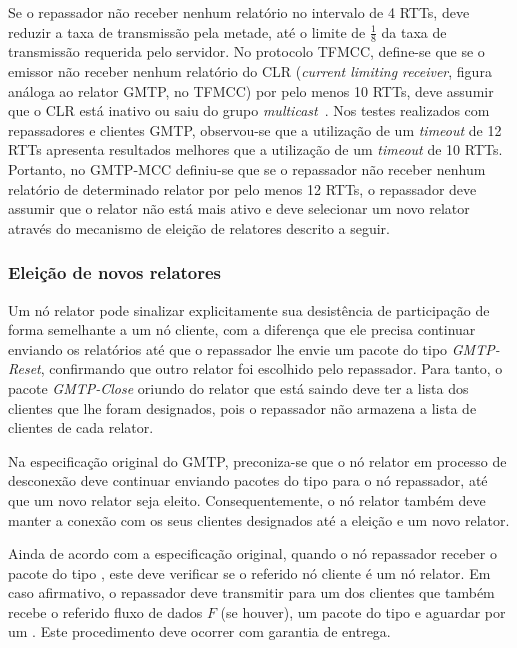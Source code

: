 Se o repassador não receber nenhum relatório no intervalo de 4 RTTs, deve reduzir a taxa de transmissão pela metade, até o limite de $\frac{1}{8}$ da taxa de transmissão requerida pelo servidor.
No protocolo TFMCC, define-se que se o emissor não receber nenhum relatório do CLR (\textit{current limiting receiver}, figura análoga ao relator GMTP, no TFMCC) por pelo menos 10 RTTs, deve assumir que o CLR está inativo ou saiu do grupo \textit{multicast}~\cite{widmer2006tcp}. 
Nos testes realizados com repassadores e clientes GMTP, observou-se que a utilização de um \textit{timeout} de 12 RTTs apresenta resultados melhores que a utilização de um \textit{timeout} de 10 RTTs. Portanto, no GMTP-MCC definiu-se que se o repassador não receber nenhum relatório de determinado relator por pelo menos 12 RTTs, o repassador deve assumir que o relator não está mais ativo e deve selecionar um novo relator através do mecanismo de eleição de relatores descrito a seguir.

\subsubsection{Eleição de novos relatores}
\label{sec:eleicao}

Um nó relator pode sinalizar explicitamente sua desistência de participação de forma semelhante a um nó cliente, com a diferença que ele precisa continuar enviando os relatórios até que o repassador lhe envie um pacote do tipo \emph{GMTP-Reset}, confirmando que outro relator foi escolhido pelo repassador.
Para tanto, o pacote \emph{GMTP-Close} oriundo do relator que está saindo deve ter a lista dos clientes que lhe foram designados, pois o repassador não armazena a lista de clientes de cada relator. 

Na especificação original do GMTP, preconiza-se que o nó relator em processo de desconexão deve continuar enviando pacotes do tipo  para o nó repassador, até que um novo relator seja eleito. Consequentemente, o nó relator também deve manter a conexão com os seus clientes designados até a eleição e um novo relator. 

Ainda de acordo com a especificação original, quando o nó repassador receber o pacote do tipo , este deve verificar se o referido nó cliente é um nó relator. Em caso afirmativo, o repassador deve transmitir para um dos clientes que também recebe o referido fluxo de dados $F$ (se houver), um pacote do tipo  e aguardar por um . Este procedimento deve ocorrer com garantia de entrega.

